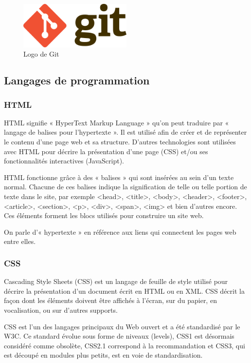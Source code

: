 \documentclass[french]{report}
\begin{document}
\begin{figure}[H]
    \centering
    \includegraphics[width=0.5\textwidth]{images/1280px-Git-logo.svg.png}
    \caption{Logo de Git}
    \label{fig:my_label}
\end{figure}

\subsection{Langages de programmation}

\subsubsection{HTML}

HTML signifie « HyperText Markup Language » qu'on peut traduire par « langage de
balises pour l'hypertexte ». Il est utilisé afin de créer et de représenter le
contenu d'une page web et sa structure. D'autres technologies sont utilisées
avec HTML pour décrire la présentation d'une page (CSS) et/ou ses
fonctionnalités interactives (JavaScript).\cite{html}

HTML fonctionne grâce à des « balises » qui sont insérées au sein d'un texte
normal. Chacune de ces balises indique la signification de telle ou telle
portion de texte dans le site, par exemple <head>, <title>, <body>, <header>,
<footer>, <article>, <section>, <p>, <div>, <span>, <img> et bien d'autres
encore. Ces éléments forment les blocs utilisés pour construire un site
web.\cite{html}

On parle d'« hypertexte » en référence aux liens qui connectent les pages web
entre elles. \cite{html}

\subsubsection{CSS }

Cascading Style Sheets (CSS) est un langage de feuille de style utilisé pour
décrire la présentation d'un document écrit en HTML ou en XML. CSS décrit la
façon dont les éléments doivent être affichés à l'écran, sur du papier, en
vocalisation, ou sur d'autres supports.\cite{css}

CSS est l'un des langages principaux du Web ouvert et a été standardisé par le
W3C. Ce standard évolue sous forme de niveaux (levels), CSS1 est désormais
considéré comme obsolète, CSS2.1 correspond à la recommandation et CSS3, qui est
découpé en modules plus petits, est en voie de standardisation.\cite{css}
\end{document}
